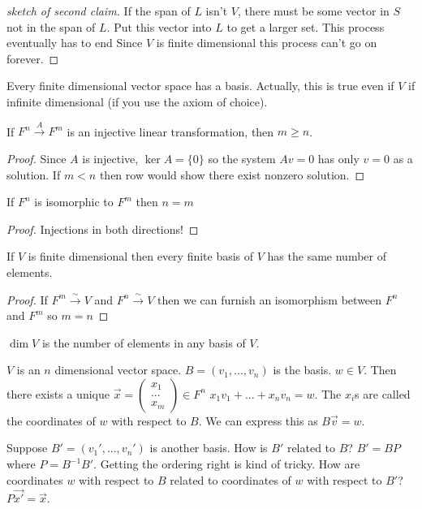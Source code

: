 \documentclass{article}
\newcommand{\ra}[1][]{\xrightarrow{#1}}
\begin{document}
\begin{proof}[sketch of second claim]
If the span of $L$ isn't $V$, there must be some vector in $S$ not in the span of $L$. Put this vector into $L$ to get a larger set. This process eventually has to end Since $V$ is finite dimensional  this process can't go on forever.
\end{proof}
\begin{corollary}
Every finite dimensional vector space has a basis. Actually, this is true even if $V$ if infinite dimensional (if you use the axiom of choice).
\end{corollary}
\begin{proposition}
If $F^n\ra[A] F^m$ is an injective linear transformation, then $m\geq n$.
\end{proposition}
\begin{proof}
Since $A$ is injective, $\ker A=\{0\}$ so the system $Av=0$ has only $v=0$ as a solution. If $m<n$ then row would show there exist nonzero solution.
\end{proof}
\begin{corollary}
If $F^n$ is isomorphic to $F^m$ then $n=m$
\end{corollary}
\begin{proof}
Injections in both directions!
\end{proof}
\begin{corollary}
If $V$ is finite dimensional then every finite basis of $V$ has the same number of elements.
\end{corollary}
\begin{proof}
If $F^m\ra[\sim]V$ and $F^n\ra[\sim]V$ then we can furnish an isomorphism between $F^n$ and $F^m$ so $m=n$
\end{proof}
\begin{definition}
$\dim V$ is the number of elements in any basis of $V$.
\end{definition}
\begin{definition}[Coordinates]
$V$ is an $n$ dimensional vector space. $B=(v_1,...,v_n)$ is the basis. $w\in V$. Then there exists a unique $\vec{x}=\begin{pmatrix}x_1\\...\\x_m\end{pmatrix}\in F^n$ $x_1v_1+...+x_nv_n=w$. The $x_i$s are called the coordinates of $w$ with respect to $B$. We can express this as $B\vec{v}=w$.
\end{definition}
\begin{definition}
Suppose $B'=(v_1',...,v_n')$ is another basis. How is $B'$ related to $B$? $B'=BP$ where $P=B^{-1}B'$. Getting the ordering right is kind of tricky. How are coordinates $w$ with respect to $B$ related to coordinates of $w$ with respect to $B'$? $P\vec{x'}=\vec{x}$.
\end{definition}
\end{document}
